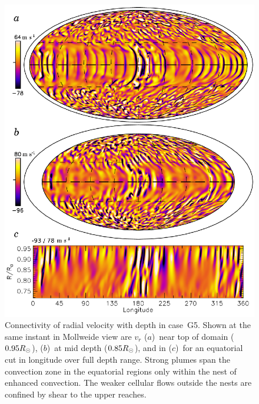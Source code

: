 \begin{figure}[htp]
  \begin{center}
    \includegraphics[width=0.8\linewidth]{figs/chapter_3/Figure_5.eps}
  \end{center}
  \caption[Connectivity of radial velocity with depth in case~G5]{%
           Connectivity of radial velocity with depth in case~G5.  Shown at
    the same instant in Mollweide view are $v_r$ 
    ($a$)~near top of domain ($0.95R_\odot$), 
    ($b$)~at mid depth ($0.85R_\odot$), 
    and in ($c$)~for an equatorial cut in longitude over full depth range.
    Strong plumes span the convection zone in the equatorial regions
    only within the nest of enhanced convection. The weaker cellular
    flows outside the nests are confined by shear to the upper reaches.
  \label{fig:G5_connectivity}}
\end{figure}


